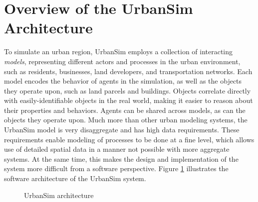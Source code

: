 
\section{Overview of the UrbanSim Architecture}
\label{sec:overview}

To simulate an urban region, UrbanSim employs a collection of
interacting \emph{models}, representing different actors and
processes in the urban environment, such as residents, businesses,
land developers, and transportation networks.  Each model encodes
the behavior of agents in the simulation, as well as the objects
they operate upon, such as land parcels and buildings.  Objects
correlate directly with easily-identifiable objects in the real
world, making it easier to reason about their properties and
behaviors.  Agents can be shared across models, as can the objects
they operate upon.  Much more than other urban modeling systems,
the UrbanSim model is very disaggregate and has high data
requirements.  These requirements enable modeling of processes to
be done at a fine level, which allows use of detailed spatial data
in a manner not possible with more aggregate systems.  At the same
time, this makes the design and implementation of the system more
difficult from a software perspective.  Figure \ref{fig:USArch}
illustrates the software architecture of the UrbanSim system.

\begin{figure}
\center {} \caption{UrbanSim
architecture} \label{fig:USArch}
\end{figure}


